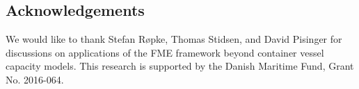 \documentclass{llncs}
\begin{document}
\subsection*{Acknowledgements}
We would like to thank Stefan R{\o}pke, Thomas Stidsen, and David Pisinger for discussions on applications of the FME framework beyond container vessel capacity models. This research is supported by the Danish Maritime Fund, Grant No. 2016-064.



\end{document}
